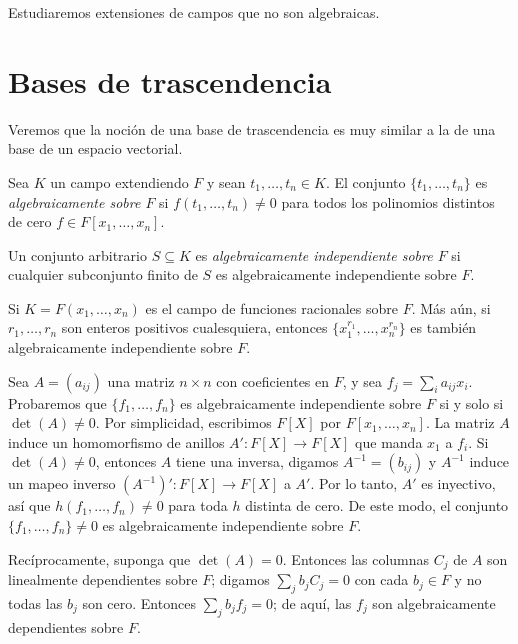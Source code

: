 Estudiaremos extensiones de campos que no son algebraicas.



\section{Bases de trascendencia}

Veremos que la noción de una base de trascendencia es muy similar a la de una base de un espacio vectorial.

\begin{definition}
  Sea $K$ un campo extendiendo $F$ y sean $t_1, \ldots, t_n \in K$. El conjunto $\{t_1, \ldots, t_n\}$ es \emph{algebraicamente sobre $F$} si $f(t_1,\ldots,t_n) \neq 0$ para todos los polinomios distintos de cero $f\in F[x_1,\ldots, x_n]$.

  Un conjunto arbitrario $S \subseteq K$ es \emph{algebraicamente independiente sobre $F$} si cualquier subconjunto finito de $S$ es algebraicamente independiente sobre $F$.
\end{definition}

\begin{example}
  Si $K=F(x_1, \ldots, x_n)$ es el campo de funciones racionales sobre $F$. Más aún, si $r_1,\ldots, r_n$ son enteros positivos cualesquiera, entonces $\{x_1^{r_1},\ldots, x_n^{r_n}\}$ es también algebraicamente independiente sobre $F$.
\end{example}

\begin{example}
  Sea $A=(a_{ij})$ una matriz $n \times n$ con coeficientes en $F$, y sea $f_j= \sum_i a_{ij}x_i$. Probaremos que $\{f_1,\ldots, f_n\}$ es algebraicamente independiente sobre $F$ si y solo si $\det(A)\neq 0$. Por simplicidad, escribimos $F[X]$ por $F[x_1, \ldots, x_n]$. La matriz $A$ induce un homomorfismo de anillos $A'\colon F[X] \to F[X]$ que manda $x_1$ a $f_i$. Si $\det(A)\neq 0$, entonces $A$ tiene una inversa, digamos $A^{-1}=(b_{ij})$ y $A^{-1}$ induce un mapeo inverso $(A^{-1})'\colon F[X]\to F[X]$ a $A'$. Por lo tanto, $A'$ es inyectivo, así que $h(f_1, \ldots, f_n) \neq 0$ para toda $h$ distinta de cero. De este modo, el conjunto $\{f_1, \ldots, f_n\}\neq 0$ es algebraicamente independiente sobre $F$.

  Recíprocamente, suponga que $\det(A)=0$. Entonces las columnas $C_j$ de $A$ son linealmente dependientes sobre $F$; digamos $\sum_j b_j C_j = 0$ con cada $b_j \in F$ y no todas las $b_j$ son cero. Entonces $\sum_j b_j f_j = 0$; de aquí, las $f_j$ son algebraicamente dependientes sobre $F$.
\end{example}

